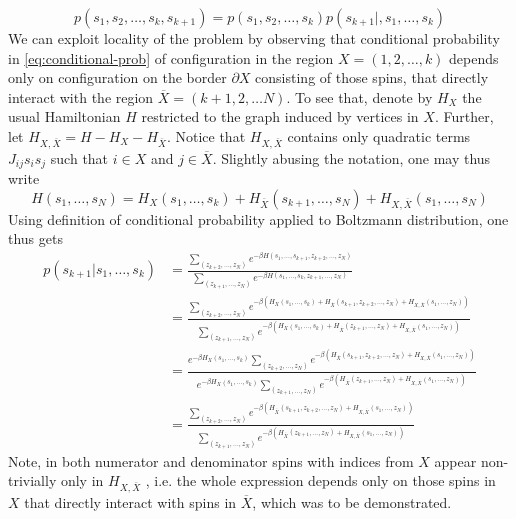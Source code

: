 \begin{equation}
  \label{eq:conditional-prob}
  p(s_1, s_2, \ldots, s_k, s_{k+1}) = p(s_1, s_2, \ldots, s_k)p(s_{k+1}|, s_1, \ldots, s_k)
\end{equation}
We can exploit locality of the problem by observing that conditional
probability in \eqref{eq:conditional-prob} of configuration in the region $X =
  (1, 2, \ldots, k)$ depends only on configuration on the border $\partial X$ consisting of those spins, that directly interact with the region
$\overline{X} = (k+1, 2, \ldots N)$. To see that, denote by $H_X$ the usual
    Hamiltonian $H$ restricted to the graph induced by vertices in $X$. Further,
    let $H_{X, \overline{X}} = H - H_X - H_{\overline{X}}$. Notice that $H_{X,
    \overline{X}}$ contains only quadratic terms $J_{ij} s_i s_j$ such that $i \in
  X$ and $j \in \overline{X}$. Slightly abusing the notation, one may thus write
    \begin{equation}
      H(s_1, \ldots, s_N) = H_X(s_1, \ldots, s_k) + H_{\overline{X}}(s_{k+1}, \ldots, s_N) + H_{X, \overline{X}}(s_1, \ldots, s_N)
    \end{equation}
    Using definition of conditional probability applied to Boltzmann distribution,
    one thus gets
    \begin{align}
      p(s_{k+1}|s_1, \ldots, s_k) & = \frac{\sum\limits_{(z_{k+2}, \ldots, z_N)}e^{-\beta H(s_1, \ldots, s_{k+1}, z_{k+2},\ldots,z_N)}}{\sum\limits_{(z_{k+1}, \ldots, z_N)}e^{-\beta H(s_1, \ldots, s_k, z_{k+1},\ldots,z_N)}}                                                                                                                                                     \\
                                  & = \frac{\sum\limits_{(z_{k+2}, \ldots, z_N)}e^{-\beta (H_X(s_1, \ldots, s_k) + H_{\overline{X}}(s_{k+1}, z_{k+2},\ldots,z_N) + H_{X, \overline{X}}(s_1, \ldots, z_N))}}{\sum\limits_{(z_{k+1}, \ldots, z_N)}e^{-\beta (H_X(s_1, \ldots, s_k) + H_{\overline{X}}(z_{k+1}, \ldots,z_N) + H_{X, \overline{X}}(s_1, \ldots, z_N))}}                 \\
                                  & = \frac{e^{-\beta H_X(s_1, \ldots, s_k)}\sum\limits_{(z_{k+2}, \ldots, z_N)} e^{-\beta(H_{\overline{X}}(s_{k+1}, z_{k+2},\ldots,z_N) + H_{X, \overline{X}}(s_1, \ldots, z_N))}}{e^{-\beta H_X(s_1, \ldots, s_k)}\sum\limits_{(z_{k+1}, \ldots, z_N)}e^{ -\beta(H_{\overline{X}}(z_{k+1}, \ldots,z_N) + H_{X, \overline{X}}(s_1, \ldots, z_N))}} \\
                                  & = \frac{\sum\limits_{(z_{k+2}, \ldots, z_N)} e^{-\beta(H_{\overline{X}}(s_{k+1}, z_{k+2},\ldots,z_N) + H_{X, \overline{X}}(s_1, \ldots, z_N))}}{\sum\limits_{(z_{k+1}, \ldots, z_N)}e^{ -\beta(H_{\overline{X}}(z_{k+1}, \ldots,z_N) + H_{X, \overline{X}}(s_1, \ldots, z_N))}}
    \end{align}
    Note, in both numerator and denominator spins with indices from $X$ appear
    non-trivially only in $H_{X, \overline{X}}$ , i.e. the whole expression depends
    only on those spins in $X$ that directly interact with spins in $\overline{X}$,
which was to be demonstrated.


